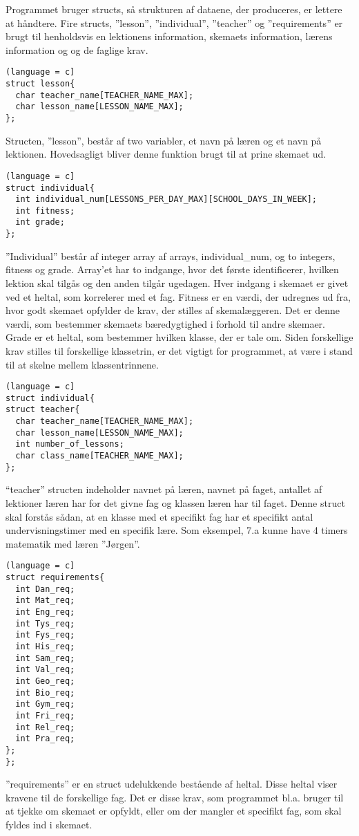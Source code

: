 Programmet bruger structs, så strukturen af dataene, der produceres, er lettere at håndtere. Fire structs, ”lesson”, ”individual”, ”teacher” og ”requirements” er brugt til henholdsvis en lektionens information, skemaets information, lærens information og og de faglige krav.
\begin{lstlisting}(language = c]
struct lesson{
  char teacher_name[TEACHER_NAME_MAX];
  char lesson_name[LESSON_NAME_MAX];
};
\end{lstlisting}
Structen, ”lesson”, består af two variabler, et navn på læren og et navn på lektionen. Hovedsagligt bliver denne funktion brugt til at prine skemaet ud.
\begin{lstlisting}(language = c]
struct individual{
  int individual_num[LESSONS_PER_DAY_MAX][SCHOOL_DAYS_IN_WEEK];
  int fitness;
  int grade;
};
\end{lstlisting}
”Individual” består af integer array af arrays, individual_num, og to integers, fitness og grade. Array’et har to indgange, hvor det første identificerer, hvilken lektion skal tilgås og den anden tilgår ugedagen. Hver indgang i skemaet er givet ved et heltal, som korrelerer med et fag. Fitness er en værdi, der udregnes ud fra, hvor godt skemaet opfylder de krav, der stilles af skemalæggeren. Det er denne værdi, som bestemmer skemaets bæredygtighed i forhold til andre skemaer. Grade er et heltal, som bestemmer hvilken klasse, der er tale om. Siden forskellige krav stilles til forskellige klassetrin, er det vigtigt for programmet, at være i stand til at skelne mellem klassentrinnene.
\begin{lstlisting}(language = c]
struct individual{
struct teacher{
  char teacher_name[TEACHER_NAME_MAX];
  char lesson_name[LESSON_NAME_MAX];
  int number_of_lessons;
  char class_name[TEACHER_NAME_MAX];
};\end{lstlisting}
“teacher” structen indeholder navnet på læren, navnet på faget, antallet af lektioner læren har for det givne fag og klassen læren har til faget. Denne struct skal forstås sådan, at en klasse med et specifikt fag har et specifikt antal undervisningstimer med en specifik lære. Som eksempel, 7.a kunne have 4 timers matematik med læren ”Jørgen”. 
\begin{lstlisting}(language = c]
struct requirements{
  int Dan_req;
  int Mat_req;
  int Eng_req;
  int Tys_req;
  int Fys_req;
  int His_req;
  int Sam_req;
  int Val_req;
  int Geo_req;
  int Bio_req;
  int Gym_req;
  int Fri_req;
  int Rel_req;
  int Pra_req;
};
};\end{lstlisting}
”requirements” er en struct udelukkende bestående af heltal. Disse heltal viser kravene til de forskellige fag. Det er disse krav, som programmet bl.a. bruger til at tjekke om skemaet er opfyldt, eller om der mangler et specifikt fag, som skal fyldes ind i skemaet.
